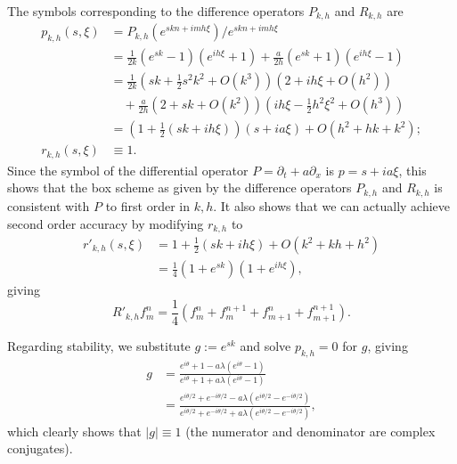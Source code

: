\documentclass{article}
\providecommand{\abs}[1]{\left\lvert#1\right\rvert}
\begin{document}
\begin{itemize}
The symbols corresponding to the difference operators $P_{k,h}$ and $R_{k,h}$ are
\begin{align*}
p_{k,h}(s,\xi) & = P_{k,h} \left( e^{skn + imh\xi} \right) / e^{skn + imh\xi} \\
               & = \frac{1}{2k} \left( e^{sk} - 1 \right) \left( e^{ih\xi} + 1 \right) + \frac{a}{2h} \left( e^{sk} + 1 \right) \left( e^{ih\xi} - 1 \right) \\
               & = \frac{1}{2k} \left( sk + \frac{1}{2} s^2 k^2 + O \left( k^3 \right) \right) \left( 2 + i h \xi + O \left( h^2 \right) \right) \\
               & \quad {} + \frac{a}{2h} \left( 2 + sk + O \left( k^2 \right) \right) \left( ih\xi - \frac{1}{2} h^2 \xi^2 + O \left( h^3 \right) \right) \\
               & = \left( 1 + \frac{1}{2} \left( sk + ih\xi \right) \right) \left( s + ia\xi \right) + O \left( h^2 + h k + k^2 \right); \\
r_{k,h}(s,\xi) & \equiv 1.
\end{align*}
Since the symbol of the differential operator $P = \partial_t + a \partial_x$ is $p = s + ia\xi$, this shows that the box scheme as given by the difference operators $P_{k,h}$ and $R_{k,h}$ is consistent with $P$ to first order in $k,h$. It also shows that we can actually achieve second order accuracy by modifying $r_{k,h}$ to
\begin{align*}
r'_{k,h}(s,\xi) & = 1 + \frac{1}{2} \left( sk + ih\xi \right) + O \left( k^2 + k h + h^2 \right) \\
                & = \frac{1}{4} \left( 1 + e^{sk} \right) \left( 1 + e^{ih\xi} \right),
\end{align*}
giving
\begin{equation*}
R'_{k,h} f^n_m = \frac{1}{4} \left( f^n_m + f^{n+1}_m + f^n_{m+1} + f^{n+1}_{m+1} \right).
\end{equation*}

Regarding stability, we substitute $g := e^{sk}$ and solve $p_{k,h} = 0$ for $g$, giving
\begin{align*}
g & = \frac{e^{i \theta} + 1 - a \lambda \left( e^{i\theta} - 1 \right)}{e^{i\theta} + 1 + a\lambda \left( e^{i\theta} - 1 \right)} \\
  & = \frac{e^{i\theta/2} + e^{-i\theta/2} - a \lambda \left( e^{i\theta/2} - e^{-i\theta/2} \right)}{e^{i\theta/2} + e^{-i\theta/2} + a \lambda \left( e^{i\theta/2} - e^{-i\theta/2} \right)},
\end{align*}
which clearly shows that $\abs{g} \equiv 1$ (the numerator and denominator are complex conjugates).


\end{itemize}
\end{document}
